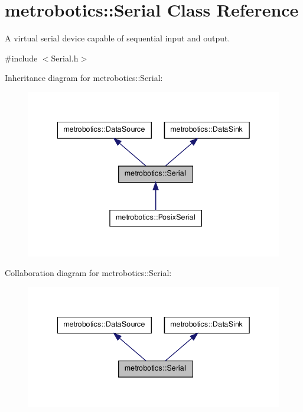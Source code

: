 \hypertarget{classmetrobotics_1_1Serial}{\section{metrobotics\-:\-:\-Serial \-Class \-Reference}
\label{classmetrobotics_1_1Serial}
}


\-A virtual serial device capable of sequential input and output.  




{\ttfamily \#include $<$\-Serial.\-h$>$}



\-Inheritance diagram for metrobotics\-:\-:\-Serial\-:
\nopagebreak
\begin{figure}[H]
\begin{center}
\leavevmode
\includegraphics[width=342pt]{classmetrobotics_1_1Serial__inherit__graph}
\end{center}
\end{figure}


\-Collaboration diagram for metrobotics\-:\-:\-Serial\-:
\nopagebreak
\begin{figure}[H]
\begin{center}
\leavevmode
\includegraphics[width=342pt]{classmetrobotics_1_1Serial__coll__graph}
\end{center}
\end{figure}
